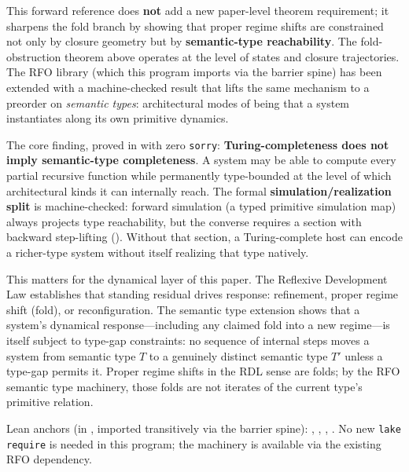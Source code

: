 \documentclass[11pt]{article}
\theoremstyle{plain}
\theoremstyle{definition}
\theoremstyle{remark}
\begin{document}
\begin{sloppypar}
This forward reference does \textbf{not} add a new paper-level theorem requirement; it sharpens the fold branch by showing that proper regime shifts are constrained not only by closure geometry but by \textbf{semantic-type reachability}.
The fold-obstruction theorem above operates at the level of states and closure trajectories. The RFO library (which this program imports via the barrier spine) has been extended with a machine-checked result that lifts the same mechanism to a preorder on \emph{semantic types}: architectural modes of being that a system instantiates along its own primitive dynamics.

The core finding, proved in  with zero \texttt{sorry}: \textbf{Turing-completeness does not imply semantic-type completeness}. A system may be able to compute every partial recursive function while permanently type-bounded at the level of which architectural kinds it can internally reach. The formal \textbf{simulation/realization split} is machine-checked: forward simulation (a typed primitive simulation map) always projects type reachability, but the converse requires a section with backward step-lifting (). Without that section, a Turing-complete host can encode a richer-type system without itself realizing that type natively.

This matters for the dynamical layer of this paper. The Reflexive Development Law establishes that standing residual drives response: refinement, proper regime shift (fold), or reconfiguration. The semantic type extension shows that a system's dynamical response---including any claimed fold into a new regime---is itself subject to type-gap constraints: no sequence of internal steps moves a system from semantic type $T$ to a genuinely distinct semantic type $T'$ unless a type-gap permits it. Proper regime shifts in the RDL sense are folds; by the RFO semantic type machinery, those folds are not iterates of the current type's primitive relation.

Lean anchors (in , imported transitively via the barrier spine): , , , . No new \texttt{lake require} is needed in this program; the machinery is available via the existing RFO dependency.
\end{sloppypar}
\end{document}
